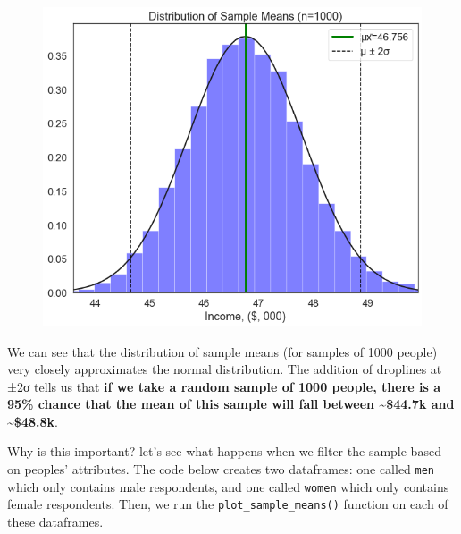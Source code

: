 \documentclass[
  letterpaper,
  DIV=11,
  numbers=noendperiod]{scrreprt}
\begin{document}
\begin{figure}[H]

{\centering \includegraphics{notebooks/W05. Distributions and Basic Statistics_files/figure-pdf/cell-26-output-1.png}

}

\end{figure}

We can see that the distribution of sample means (for samples of 1000
people) very closely approximates the normal distribution. The addition
of droplines at ±2σ tells us that \textbf{if we take a random sample of
1000 people, there is a 95\% chance that the mean of this sample will
fall between \textasciitilde\$44.7k and \textasciitilde\$48.8k}.

Why is this important? let's see what happens when we filter the sample
based on peoples' attributes. The code below creates two dataframes: one
called \texttt{men} which only contains male respondents, and one called
\texttt{women} which only contains female respondents. Then, we run the
\texttt{plot\_sample\_means()} function on each of these dataframes.
\end{document}
